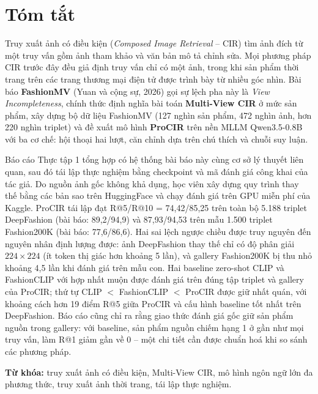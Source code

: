 \chapter*{Tóm tắt}
\onehalfspacing
\vspace{1.0cm}

Truy xuất ảnh có điều kiện (\emph{Composed Image Retrieval} -- CIR) tìm ảnh đích từ một truy vấn gồm ảnh tham khảo và văn bản mô tả chỉnh sửa. Mọi phương pháp CIR trước đây đều giả định truy vấn chỉ có một ảnh, trong khi sản phẩm thời trang trên các trang thương mại điện tử được trình bày từ nhiều góc nhìn. Bài báo \textbf{FashionMV} (Yuan và cộng sự, 2026) gọi sự lệch pha này là \emph{View Incompleteness}, chính thức định nghĩa bài toán \textbf{Multi-View CIR} ở mức sản phẩm, xây dựng bộ dữ liệu FashionMV (127 nghìn sản phẩm, 472 nghìn ảnh, hơn 220 nghìn triplet) và đề xuất mô hình \textbf{ProCIR} trên nền MLLM Qwen3.5-0.8B với ba cơ chế: hội thoại hai lượt, căn chỉnh dựa trên chú thích và chuỗi suy luận.

Báo cáo Thực tập 1 tổng hợp có hệ thống bài báo này cùng cơ sở lý thuyết liên quan, sau đó tái lập thực nghiệm bằng checkpoint và mã đánh giá công khai của tác giả. Do nguồn ảnh gốc không khả dụng, học viên xây dựng quy trình thay thế bằng các bản sao trên HuggingFace và chạy đánh giá trên GPU miễn phí của Kaggle. ProCIR tái lập đạt R@5/R@10 = 74,42/85,25 trên toàn bộ 5.188 triplet DeepFashion (bài báo: 89,2/94,9) và 87,93/94,53 trên mẫu 1.500 triplet Fashion200K (bài báo: 77,6/86,6). Hai sai lệch ngược chiều được truy nguyên đến nguyên nhân định lượng được: ảnh DeepFashion thay thế chỉ có độ phân giải $224 \times 224$ (ít token thị giác hơn khoảng 5 lần), và gallery Fashion200K bị thu nhỏ khoảng 4,5 lần khi đánh giá trên mẫu con. Hai baseline zero-shot CLIP và FashionCLIP với hợp nhất muộn được đánh giá trên đúng tập triplet và gallery của ProCIR; thứ tự CLIP $<$ FashionCLIP $<$ ProCIR được giữ nhất quán, với khoảng cách hơn 19 điểm R@5 giữa ProCIR và cấu hình baseline tốt nhất trên DeepFashion. Báo cáo cũng chỉ ra rằng giao thức đánh giá gốc giữ sản phẩm nguồn trong gallery: với baseline, sản phẩm nguồn chiếm hạng 1 ở gần như mọi truy vấn, làm R@1 giảm gần về 0 -- một chi tiết cần được chuẩn hoá khi so sánh các phương pháp.

\bigskip
\noindent\textbf{Từ khóa:} truy xuất ảnh có điều kiện, Multi-View CIR, mô hình ngôn ngữ lớn đa phương thức, truy xuất ảnh thời trang, tái lập thực nghiệm.
